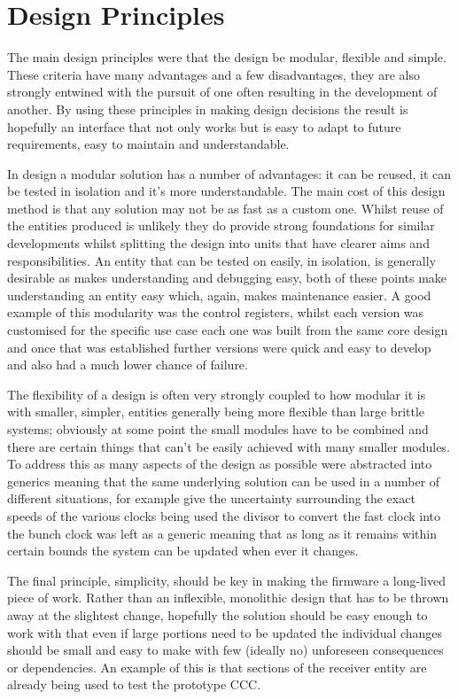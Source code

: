 \section{Design Principles} %
\label{sec:design_principles}
The main design principles were that the design be modular, flexible and simple. These criteria have many advantages and a few disadvantages, they are also strongly entwined with the pursuit of one often resulting in the development of another. By using these principles in making design decisions the result is hopefully an interface that not only works but is easy to adapt to future requirements, easy to maintain and understandable.

In design a modular solution has a number of advantages: it can be reused, it can be tested in isolation and it's more understandable. The main cost of this design method is that any solution may not be as fast as a custom one. Whilst reuse of the entities produced is unlikely they do provide strong foundations for similar developments whilst splitting the design into units that have clearer aims and responsibilities. An entity that can be tested on easily, in isolation, is generally desirable as makes understanding and debugging easy, both of these points make understanding an entity easy which, again, makes maintenance easier. A good example of this modularity was the control registers, whilst each version was customised for the specific use case each one was built from the same core design and once that was established further versions were quick and easy to develop and also had a much lower chance of failure.

The flexibility of a design is often very strongly coupled to how modular it is with smaller, simpler, entities generally being more flexible than large brittle systems; obviously at some point the small modules have to be combined and there are certain things that can't be easily achieved with many smaller modules. To address this as many aspects of the design as possible were abstracted into generics meaning that the same underlying solution can be used in a number of different situations, for example give the uncertainty surrounding the exact speeds of the various clocks being used the divisor to convert the fast clock into the bunch clock was left as a generic meaning that as long as it remains within certain bounds the system can be updated when ever it changes.

The final principle, simplicity, should be key in making the firmware a long-lived piece of work. Rather than an inflexible, monolithic design that has to be thrown away at the slightest change, hopefully the solution should be easy enough to work with that even if large portions need to be updated the individual changes should be small and easy to make with few (ideally no) unforeseen consequences or dependencies. An example of this is that sections of the receiver entity are already being used to test the prototype CCC.
